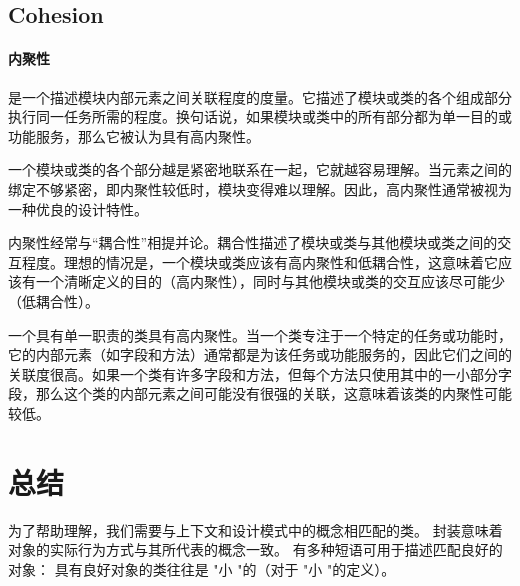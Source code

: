\subsection{Cohesion}
\paragraph{内聚性}是一个描述模块内部元素之间关联程度的度量。它描述了模块或类的各个组成部分执行同一任务所需的程度。换句话说，如果模块或类中的所有部分都为单一目的或功能服务，那么它被认为具有高内聚性。

一个模块或类的各个部分越是紧密地联系在一起，它就越容易理解。当元素之间的绑定不够紧密，即内聚性较低时，模块变得难以理解。因此，高内聚性通常被视为一种优良的设计特性。

内聚性经常与“耦合性”相提并论。耦合性描述了模块或类与其他模块或类之间的交互程度。理想的情况是，一个模块或类应该有高内聚性和低耦合性，这意味着它应该有一个清晰定义的目的（高内聚性），同时与其他模块或类的交互应该尽可能少（低耦合性）。

一个具有单一职责的类具有高内聚性。当一个类专注于一个特定的任务或功能时，它的内部元素（如字段和方法）通常都是为该任务或功能服务的，因此它们之间的关联度很高。如果一个类有许多字段和方法，但每个方法只使用其中的一小部分字段，那么这个类的内部元素之间可能没有很强的关联，这意味着该类的内聚性可能较低。

\section{总结}
为了帮助理解，我们需要与上下文和设计模式中的概念相匹配的类。
封装意味着对象的实际行为方式与其所代表的概念一致。
有多种短语可用于描述匹配良好的对象： 具有良好对象的类往往是 "小 "的（对于 "小 "的定义）。